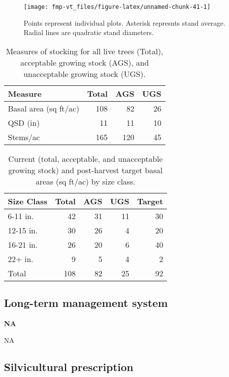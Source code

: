 \documentclass[]{tufte-handout}
\begin{document}
\begin{figure}
\texttt{[image: fmp-vt\_files/figure-latex/unnamed-chunk-41-1]} \caption[Points represent individual plots]{Points represent individual plots. Asterisk represnts stand average. Radial lines are quadratic stand diameters.}\label{fig:unnamed-chunk-41}
\end{figure}

\begin{table}

\caption{\label{tab:unnamed-chunk-42}Measures of stocking for all live trees (Total), acceptable growing stock (AGS), and unacceptable growing stock (UGS).}
\centering
\begin{tabular}[t]{lrrr}
\toprule
Measure & Total & AGS & UGS\\
\midrule
Basal area (sq ft/ac) & 108 & 82 & 26\\
QSD (in) & 11 & 11 & 10\\
Stems/ac & 165 & 120 & 45\\
\bottomrule
\end{tabular}
\end{table}

\begin{table}

\caption{\label{tab:unnamed-chunk-43}Current (total, acceptable, and unacceptable growing stock) and post-harvest target basal areas (sq ft/ac) by size class.}
\centering
\begin{tabular}[t]{lrrrr}
\toprule
Size Class & Total & AGS & UGS & Target\\
\midrule
6-11 in. & 42 & 31 & 11 & 30\\
12-15 in. & 30 & 26 & 4 & 20\\
16-21 in. & 26 & 20 & 6 & 40\\
22+ in. & 9 & 5 & 4 & 2\\
Total & 108 & 82 & 25 & 92\\
\bottomrule
\end{tabular}
\end{table}

\subsection{Long-term management
system}\label{long-term-management-system-6}

\textbf{NA}

NA

\subsection{Silvicultural
prescription}\label{silvicultural-prescription-6}
\end{document}
